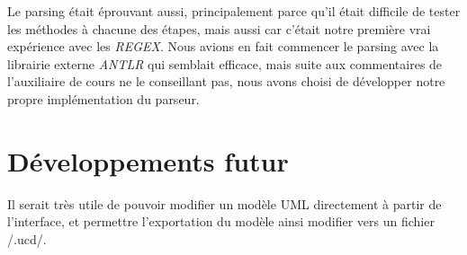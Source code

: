 \documentclass[letter,french]{report}
\begin{document}
  Le parsing était éprouvant aussi, principalement parce qu'il était difficile
  de tester les méthodes à chacune des étapes, mais aussi car c'était notre
  première vrai expérience avec les \emph{REGEX}. Nous avions en fait commencer
  le parsing avec la librairie externe \emph{ANTLR} qui semblait efficace, mais
  suite aux commentaires de l'auxiliaire de cours ne le conseillant pas, nous
  avons choisi de développer notre propre implémentation du parseur.

	\section*{Développements futur}
	Il serait très utile de pouvoir modifier un modèle UML directement à partir de l'interface,
	et permettre l'exportation du modèle ainsi modifier vers un fichier /.ucd/.
	
	
\end{document}
